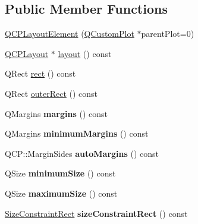 \subsection*{Public Member Functions}
\begin{DoxyCompactItemize}
\item 
\hyperlink{classQCPLayoutElement_a8947f0ada17e672aaba3d424cbbb67e3}{Q\+C\+P\+Layout\+Element} (\hyperlink{classQCustomPlot}{Q\+Custom\+Plot} $\ast$parent\+Plot=0)
\item 
\hyperlink{classQCPLayout}{Q\+C\+P\+Layout} $\ast$ \hyperlink{classQCPLayoutElement_a4efdcbde9d28f410e5ef166c9d691deb}{layout} () const
\item 
Q\+Rect \hyperlink{classQCPLayoutElement_a208effccfe2cca4a0eaf9393e60f2dd4}{rect} () const
\item 
Q\+Rect \hyperlink{classQCPLayoutElement_a2a32a12a6161c9dffbadeb9cc585510c}{outer\+Rect} () const
\item 
\mbox{\label{classQCPLayoutElement_af4ac9450aa2d60863bf3a8ea0c940c9d}} 
Q\+Margins {\bfseries margins} () const
\item 
\mbox{\label{classQCPLayoutElement_a5eae30e28f28d73fd1c56409c011393e}} 
Q\+Margins {\bfseries minimum\+Margins} () const
\item 
\mbox{\label{classQCPLayoutElement_a2585bc8c5cc70ee712909751a2fc8909}} 
Q\+C\+P\+::\+Margin\+Sides {\bfseries auto\+Margins} () const
\item 
\mbox{\label{classQCPLayoutElement_a60d4295468a2b57fe91f6f68e20c3993}} 
Q\+Size {\bfseries minimum\+Size} () const
\item 
\mbox{\label{classQCPLayoutElement_afb9503858d4aa0f3b9f1794b084fb40a}} 
Q\+Size {\bfseries maximum\+Size} () const
\item 
\mbox{\label{classQCPLayoutElement_a66136f121ee3e1c933b748761203cab4}} 
\hyperlink{classQCPLayoutElement_a0afb3e5773529e4bd20e448f81be4d2a}{Size\+Constraint\+Rect} {\bfseries size\+Constraint\+Rect} () const
\item 
\mbox{\label{classQCPLayoutElement_a8af6bcf81e12fe1d6f44490f34522b90}} 

\end{DoxyCompactItemize}
